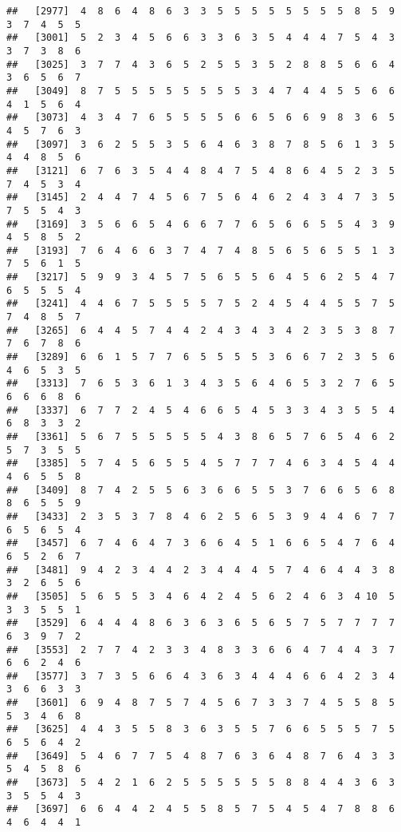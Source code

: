 \documentclass[
]{book}
\begin{document}
\begin{verbatim}
##   [2977]  4  8  6  4  8  6  3  3  5  5  5  5  5  5  5  5  8  5  9  3  7  4  5  5
##   [3001]  5  2  3  4  5  6  6  3  3  6  3  5  4  4  4  7  5  4  3  3  7  3  8  6
##   [3025]  3  7  7  4  3  6  5  2  5  5  3  5  2  8  8  5  6  6  4  3  6  5  6  7
##   [3049]  8  7  5  5  5  5  5  5  5  5  3  4  7  4  4  5  5  6  6  4  1  5  6  4
##   [3073]  4  3  4  7  6  5  5  5  5  6  6  5  6  6  9  8  3  6  5  4  5  7  6  3
##   [3097]  3  6  2  5  5  3  5  6  4  6  3  8  7  8  5  6  1  3  5  4  4  8  5  6
##   [3121]  6  7  6  3  5  4  4  8  4  7  5  4  8  6  4  5  2  3  5  7  4  5  3  4
##   [3145]  2  4  4  7  4  5  6  7  5  6  4  6  2  4  3  4  7  3  5  7  5  5  4  3
##   [3169]  3  5  6  6  5  4  6  6  7  7  6  5  6  6  5  5  4  3  9  4  5  8  5  2
##   [3193]  7  6  4  6  6  3  7  4  7  4  8  5  6  5  6  5  5  1  3  7  5  6  1  5
##   [3217]  5  9  9  3  4  5  7  5  6  5  5  6  4  5  6  2  5  4  7  6  5  5  5  4
##   [3241]  4  4  6  7  5  5  5  5  7  5  2  4  5  4  4  5  5  7  5  7  4  8  5  7
##   [3265]  6  4  4  5  7  4  4  2  4  3  4  3  4  2  3  5  3  8  7  7  6  7  8  6
##   [3289]  6  6  1  5  7  7  6  5  5  5  5  3  6  6  7  2  3  5  6  4  6  5  3  5
##   [3313]  7  6  5  3  6  1  3  4  3  5  6  4  6  5  3  2  7  6  5  6  6  6  8  6
##   [3337]  6  7  7  2  4  5  4  6  6  5  4  5  3  3  4  3  5  5  4  6  8  3  3  2
##   [3361]  5  6  7  5  5  5  5  5  4  3  8  6  5  7  6  5  4  6  2  5  7  3  5  5
##   [3385]  5  7  4  5  6  5  5  4  5  7  7  7  4  6  3  4  5  4  4  4  6  5  5  8
##   [3409]  8  7  4  2  5  5  6  3  6  6  5  5  3  7  6  6  5  6  8  8  6  5  5  9
##   [3433]  2  3  5  3  7  8  4  6  2  5  6  5  3  9  4  4  6  7  7  6  5  6  5  4
##   [3457]  6  7  4  6  4  7  3  6  6  4  5  1  6  6  5  4  7  6  4  6  5  2  6  7
##   [3481]  9  4  2  3  4  4  2  3  4  4  4  5  7  4  6  4  4  3  8  3  2  6  5  6
##   [3505]  5  6  5  5  3  4  6  4  2  4  5  6  2  4  6  3  4 10  5  3  3  5  5  1
##   [3529]  6  4  4  4  8  6  3  6  3  6  5  6  5  7  5  7  7  7  7  6  3  9  7  2
##   [3553]  2  7  7  4  2  3  3  4  8  3  3  6  6  4  7  4  4  3  7  6  6  2  4  6
##   [3577]  3  7  3  5  6  6  4  3  6  3  4  4  4  6  6  4  2  3  4  3  6  6  3  3
##   [3601]  6  9  4  8  7  5  7  4  5  6  7  3  3  7  4  5  5  8  5  5  3  4  6  8
##   [3625]  4  4  3  5  5  8  3  6  3  5  5  7  6  6  5  5  5  7  5  6  5  6  4  2
##   [3649]  5  4  6  7  7  5  4  8  7  6  3  6  4  8  7  6  4  3  3  5  4  5  8  6
##   [3673]  5  4  2  1  6  2  5  5  5  5  5  5  8  8  4  4  3  6  3  3  5  5  4  3
##   [3697]  6  6  4  4  2  4  5  5  8  5  7  5  4  5  4  7  8  8  6  4  6  4  4  1

\end{verbatim}
\end{document}
